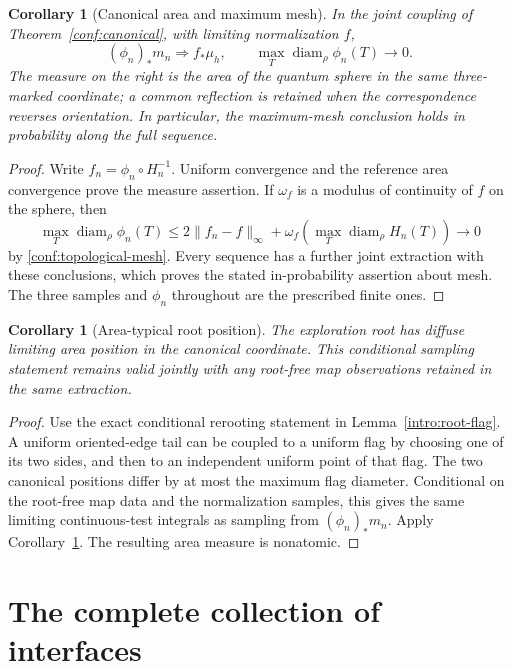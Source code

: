 \documentclass[11pt]{article}
\numberwithin{equation}{section}
\newtheorem{corollary}[theorem]{Corollary}
\theoremstyle{definition}
\theoremstyle{remark}
\newcommand{\1}{\mathbf 1}
\begin{document}
\begin{corollary}[Canonical area and maximum mesh]
\label{conf:mesh-area}
In the joint coupling of Theorem~\ref{conf:canonical}, with
limiting normalization \(f\),
\[
 (\phi_n)_*m_n\Rightarrow f_*\mu_h,
 \qquad
 \max_T\operatorname{diam}_\rho\phi_n(T)\longrightarrow0.
\]
The measure on the right is the area of the quantum sphere in
the same three-marked coordinate; a common reflection is retained
when the correspondence reverses orientation.  In particular,
the maximum-mesh conclusion holds in probability along the full
sequence.
\end{corollary}

\begin{proof}
Write \(f_n=\phi_n\circ H_n^{-1}\).  Uniform convergence and
the reference area convergence prove the measure assertion.  If
\(\omega_f\) is a modulus of continuity of \(f\) on the sphere,
then
\[
 \max_T\operatorname{diam}_\rho\phi_n(T)
 \le2\|f_n-f\|_\infty+
       \omega_f\!\left(\max_T\operatorname{diam}_\rho H_n(T)\right)
       \longrightarrow0
\]
by \eqref{conf:topological-mesh}.  Every sequence has a further
joint extraction with these conclusions, which proves the stated
in-probability assertion about mesh.  The
three samples and \(\phi_n\) throughout are the prescribed
finite ones.
\end{proof}

\begin{corollary}[Area-typical root position]
\label{conf:root-area}
The exploration root has diffuse limiting area position in the
canonical coordinate.  This conditional sampling statement remains
valid jointly with any root-free map observations retained in the
same extraction.
\end{corollary}

\begin{proof}
Use the exact conditional rerooting statement in
Lemma~\ref{intro:root-flag}.  A uniform oriented-edge tail can be
coupled to a uniform flag by choosing one of its two sides, and
then to an independent uniform point of that flag.  The two
canonical positions differ by at most the maximum flag diameter.
Conditional on the root-free map data and the normalization
samples, this gives the same limiting continuous-test integrals
as sampling from \((\phi_n)_*m_n\).  Apply
Corollary~\ref{conf:mesh-area}.  The resulting area measure is
nonatomic.
\end{proof}

\section{The complete collection of interfaces}\label{loop:section}
\end{document}
